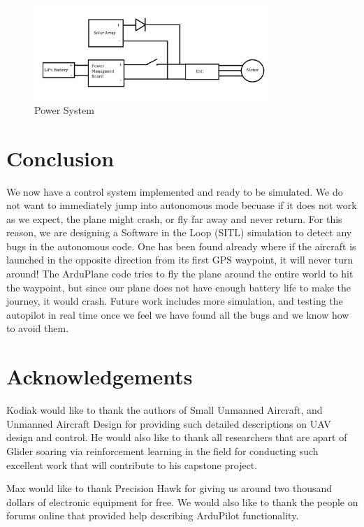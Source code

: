 \documentclass[12pt,journal,compsoc]{IEEEtran}
\begin{document}
\begin{figure}[h!]
\hspace*{0cm}
\centering
\includegraphics[width=3.5in]{Solar_Circuit.png}
\caption{Power System}
\label{Solar_Circuit}
\end{figure}


\section{Conclusion}
We now have a control system implemented and ready to be simulated. We do not want to immediately jump into autonomous mode becuase if it does not work as we expect, the plane might crash, or fly far away and never return. For this reason, we are designing a Software in the Loop (SITL) simulation to detect any bugs in the autonomous code. One has been found already where if the aircraft is launched in the opposite direction from its first GPS waypoint, it will never turn around! The ArduPlane code tries to fly the plane around the entire world to hit the waypoint, but since our plane does not have enough battery life to make the journey, it would crash. Future work includes more simulation, and testing the autopilot in real time once we feel we have found all the bugs and we know how to avoid them.

\section*{Acknowledgements}
Kodiak would like to thank the authors of Small Unmanned Aircraft, and Unmanned Aircraft Design for providing such detailed descriptions on UAV design and control. He would also like to thank all researchers that are apart of Glider soaring via reinforcement learning in the field \cite{GliderBirds} for conducting such excellent work that will contribute to his capstone project.

Max would like to thank Precision Hawk for giving us around two thousand dollars of electronic equipment for free. We would also like to thank the people on forums online that provided help describing ArduPilot functionality.
\end{document}
